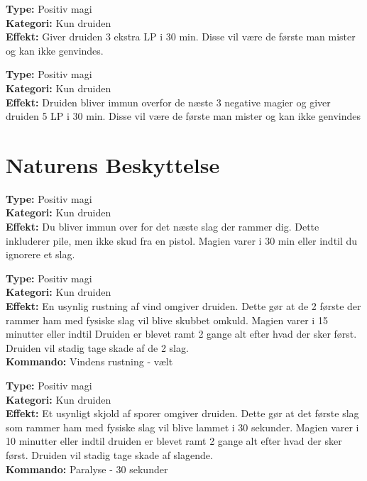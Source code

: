 \begin{mkær*}
\textbf{Type:} Positiv magi\\ 
\textbf{Kategori:} Kun druiden\\
\textbf{Effekt:} Giver druiden 3 ekstra LP i 30 min. Disse vil være de første man mister og kan ikke genvindes.
\end{mkær*}

\begin{mkær*}
\textbf{Type:} Positiv magi\\
\textbf{Kategori:} Kun druiden\\
\textbf{Effekt:} Druiden bliver immun overfor de næste 3 negative magier og giver druiden 5 LP i 30 min. Disse vil være de første man mister og kan ikke genvindes
\end{mkær*}

\section*{Naturens Beskyttelse}

\begin{nbesk*}[Sandhud]
\textbf{Type:} Positiv magi\\ 
\textbf{Kategori:} Kun druiden\\
\textbf{Effekt:} Du bliver immun over for det næste slag der rammer dig. Dette inkluderer pile, men ikke skud fra en pistol. Magien varer i 30 min eller indtil du ignorere et slag.
\end{nbesk*}

\begin{nbesk*}
\textbf{Type:} Positiv magi\\
\textbf{Kategori:} Kun druiden\\
\textbf{Effekt:} En usynlig rustning af vind omgiver druiden. Dette gør at de 2 første der rammer ham med fysiske slag vil blive skubbet omkuld. Magien varer i 15 minutter eller indtil Druiden er blevet ramt 2 gange alt efter hvad der sker først. Druiden vil stadig tage skade af de 2 slag.\\
\textbf{Kommando:} Vindens rustning - vælt
\end{nbesk*}

\begin{nbesk*}
\textbf{Type:} Positiv magi\\ 
\textbf{Kategori:} Kun druiden\\
\textbf{Effekt:} Et usynligt skjold af sporer omgiver druiden. Dette gør at det første slag som rammer ham med fysiske slag vil blive lammet i 30 sekunder. Magien varer i 10 minutter eller indtil druiden er blevet ramt 2 gange alt efter hvad der sker først. Druiden vil stadig tage skade af slagende.\\
\textbf{Kommando:} Paralyse - 30 sekunder
\end{nbesk*}

